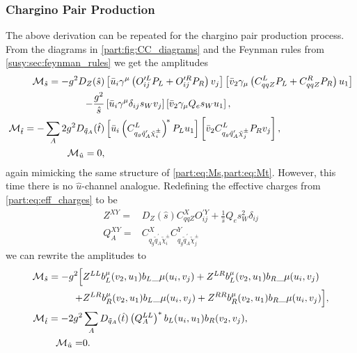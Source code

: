 \documentclass[../main.tex]{subfiles}
\begin{document}
\subsubsection*{Chargino Pair Production}
The above derivation can be repeated for the chargino pair production process.
From the diagrams in \cref{part:fig:CC_diagrams} and the Feynman rules from \cref{susy:sec:feynman_rules} we get the amplitudes
\begin{subequations}
  \begin{align}
    \nonumber
    \mathcal{M}_{\hat{s}} = -g^2 D_Z(\hat{s})                     & \left[ \bar{u}_i\gamma^\mu\left(O^{\prime L}_{ij}P_L + O^{\prime R}_{ij}P_R\right) v_j \right] \left[ \bar{v}_2 \gamma_\mu \left(C^L_{qqZ}P_L + C^R_{qqZ}P_R\right) u_1 \right]
    \\
    \label{part:eq:CC_Ms}
    -\frac{g^2}{\hat{s}}                                 & \left[ \bar{u}_i\gamma^\mu \delta_{ij} s_W v_j \right] \left[ \bar{v}_2 \gamma_\mu Q_e s_W u_1 \right],                                                                          \\
    \label{part:eq:CC_Mt}
    \mathcal{M}_{\hat{t}} = -\sum_A 2g^2 D_{\tilde{q}_A}(\hat{t}) & \left[ \bar{u}_i \left(C_{q_g \tilde{q}_A^\prime \tilde\chi^\pm_i}^L\right)^{\!\ast} P_L u_1 \right] \left[ \bar{v}_2 C_{q_g \tilde{q}_A^\prime \tilde\chi^\pm_j}^L P_R v_j\right], \\
    \label{part:eq:CC_Mu}
    \mathcal{M}_{\hat{u}} = 0,                                    &
  \end{align}
\end{subequations}
again mimicking the same structure of \cref{part:eq:Ms,part:eq:Mt}.
However, this time there is no \(\hat{u}\)-channel analogue.
Redefining the effective charges from \cref{part:eq:eff_charges} to be
\begin{subequations}
  \begin{align*}
    Z^{XY} =   & D_Z(\hat{s}) C_{qqZ}^X O_{ij}^{\prime Y} + \frac{1}{\hat{s}} Q_e s_W^2 \delta_{ij}          \\
    Q_A^{XY} = & C_{q_g \tilde{q}_A^\prime \tilde\chi^\pm_i}^X C_{q_g \tilde{q}_A^\prime \tilde\chi^\pm_j}^Y
  \end{align*}
\end{subequations}
we can rewrite the amplitudes to
\begin{subequations}
  \begin{align}
    \nonumber
    \mathcal{M}_{\hat{s}} = -g^2 \Big[ &
    Z^{LL} b_L^\mu(v_2, u_1){b_L}\_{\mu}(u_i, v_j) + Z^{LR} b_L^\mu(v_2, u_1){b_R}\_{\mu}(u_i, v_j)                  \\
    +                         & Z^{LR} b_{R}^\mu(v_2, u_1){b_L}\_{\mu}(u_i, v_j) +
    Z^{RR} b_R^\mu(v_2, u_1){b_R}\_{\mu}(u_i, v_j) \Big],                                                            \\
    \mathcal{M}_{\hat{t}} = -2g^2      & \sum_A D_{\tilde{q}_A}(\hat{t}) \left(Q_A^{LL}\right)^\ast b_L(u_i, u_1) b_R(v_2, v_j), \\
    \mathcal{M}_{\hat{u}} =            & 0.
  \end{align}
\end{subequations}
\end{document}
